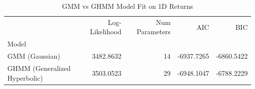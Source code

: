 \begin{table}
\caption{GMM vs GHMM Model Fit on 1D Returns}
\label{tab:fit_comparison}
\begin{tabular}{lrrrr}
\toprule
 & Log-Likelihood & Num Parameters & AIC & BIC \\
Model &  &  &  &  \\
\midrule
GMM (Gaussian) & 3482.8632 & 14 & -6937.7265 & -6860.5422 \\
GHMM (Generalized Hyperbolic) & 3503.0523 & 29 & -6948.1047 & -6788.2229 \\
\bottomrule
\end{tabular}
\end{table}
